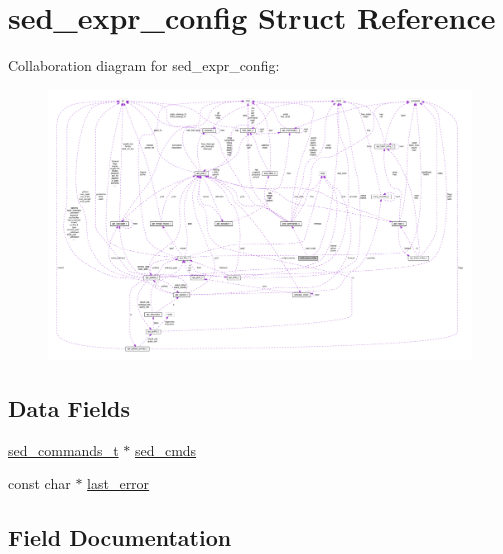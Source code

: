 \hypertarget{structsed__expr__config}{}\section{sed\+\_\+expr\+\_\+config Struct Reference}
\label{structsed__expr__config}


Collaboration diagram for sed\+\_\+expr\+\_\+config\+:
\nopagebreak
\begin{figure}[H]
\begin{center}
\leavevmode
\includegraphics[width=350pt]{structsed__expr__config__coll__graph}
\end{center}
\end{figure}
\subsection*{Data Fields}
\begin{DoxyCompactItemize}
\item 
\hyperlink{libsed_8h_a859d78cc648723665a860a763f2fb291}{sed\+\_\+commands\+\_\+t} $\ast$ \hyperlink{structsed__expr__config_ab5253a4b22d52752fc5fdefd1a3a5230}{sed\+\_\+cmds}
\item 
const char $\ast$ \hyperlink{structsed__expr__config_af04f1a3c8174221aec8e9a026bd3b5e6}{last\+\_\+error}
\end{DoxyCompactItemize}


\subsection{Field Documentation}
